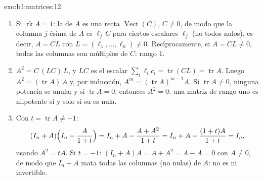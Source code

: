 \begin{solution}{exo:b1:matrices:12}
\begin{enumerate}
  \item Si $\operatorname{rk} A = 1$: la  de $A$ es una recta
        $\operatorname{Vect}(C)$, $C \neq 0$, de modo que la columna
        $j$-ésima de $A$ es $\ell_j\,C$ para ciertos escalares
        $\ell_j$ (no todos nulos), es decir, $A = C L$ con
        $L = (\ell_1, \dots, \ell_n) \neq 0$. Recíprocamente, si
        $A = CL \neq 0$, todas las columnas son múltiplos de $C$:
        rango $1$.
  \item $A^2 = C\,(L C)\,L$, y $LC$ es el escalar
        $\sum_i \ell_i c_i = \operatorname{tr}(CL) =
        \operatorname{tr} A$. Luego $A^2 = (\operatorname{tr} A)\,A$
        y, por inducción, $A^m = (\operatorname{tr} A)^{m-1} A$. Si
        $\operatorname{tr} A \neq 0$, ninguna potencia se anula; y
        si $\operatorname{tr} A = 0$, entonces $A^2 = 0$: una matriz
        de rango uno es nilpotente si y solo si su  es nula.
  \item Con $t = \operatorname{tr} A \neq -1$:
        \[
        (I_n + A)\Bigl(I_n - \frac{A}{1 + t}\Bigr)
        = I_n + A - \frac{A + A^2}{1 + t}
        = I_n + A - \frac{(1 + t)A}{1 + t} = I_n ,
        \]
        usando $A^2 = tA$. Si $t = -1$:
        $(I_n + A)A = A + A^2 = A - A = 0$ con $A \neq 0$, de modo
        que $I_n + A$ mata todas las columnas (no nulas) de $A$: no
        es  ni invertible.
\end{enumerate}
\end{solution}

